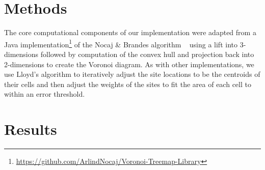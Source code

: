 \documentclass{acm_proc_article-sp} \usepackage{cite}
\begin{document}
\section{Methods}
\label{sec:methods}
The core computational components of our implementation were adapted
from a Java implementation\footnote{\url{https://github.com/ArlindNocaj/Voronoi-Treemap-Library}}
 of the Nocaj \& Brandes algorithm
~\cite{nocaj:faster} using a lift into 3-dimensions followed by
computation of the convex hull and projection back into 2-dimensions
to create the Voronoi diagram. As with other implementations, we use
Lloyd's algorithm to iteratively adjust the site locations to be the
centroids of their cells and then adjust the weights of the sites to
fit the area of each cell to within an error threshold.

\section{Results}
\label{sec:results}
\end{document}
